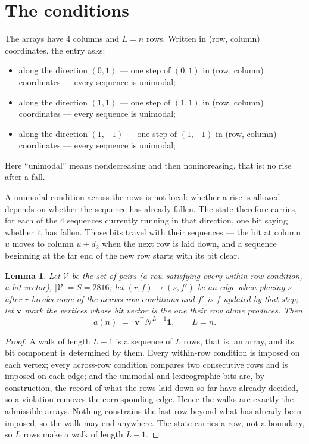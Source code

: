 \documentclass[11pt,a4paper]{article}
\theoremstyle{plain}
\newtheorem{lemma}[theorem]{Lemma}
\theoremstyle{definition}
\begin{document}
\section{The conditions}

The arrays have $4$ columns and $L=n$ rows. Written in (row, column)
coordinates, the entry asks:
\begin{itemize}
\item along the direction $(0,1)$ --- one step of $(0,1)$ in (row, column) coordinates --- every sequence is unimodal;
\item along the direction $(1,1)$ --- one step of $(1,1)$ in (row, column) coordinates --- every sequence is unimodal;
\item along the direction $(1,-1)$ --- one step of $(1,-1)$ in (row, column) coordinates --- every sequence is unimodal;
\end{itemize}
Here ``unimodal'' means nondecreasing and then nonincreasing, that is: no rise after a fall.

A unimodal condition across the rows is not local: whether a
rise is allowed depends on whether the sequence has already fallen. The state therefore
carries, for each of the $4$ sequences currently running in that direction, one bit saying
whether it has fallen. Those bits travel with their sequences --- the bit at column $u$
moves to column $u+d_2$ when the next row is laid down, and a sequence beginning at the
far end of the new row starts with its bit clear.

\begin{lemma}\label{lem:walk}
Let $\mathcal V$ be the set of pairs (a row satisfying every within-row condition, a
bit vector), $|\mathcal V|=S=2816$; let $(r,f)\to(s,f')$ be an edge when placing $s$ after $r$
breaks none of the across-row conditions and $f'$ is $f$ updated by that step; let
$\mathbf{v}$ mark the vertices whose bit vector is the one their row alone produces.
Then
\[
a(n)\;=\;\,\mathbf{v}^{\!\top}N^{\,L-1}\mathbf{1},\qquad L=n.
\]
\end{lemma}

\begin{proof}
A walk of length $L-1$ is a sequence of $L$ rows, that is, an array, and its bit component
is determined by them. Every within-row condition is imposed on each vertex; every
across-row condition compares two consecutive rows and is imposed on each edge; and the
unimodal and lexicographic bits are, by construction, the record of what the rows laid down
so far have already decided, so a violation removes the corresponding edge. Hence the walks
are exactly the admissible arrays. Nothing constrains the last row beyond what has already
been imposed, so the walk may end anywhere. The state carries a row, not a boundary, so
$L$ rows make a walk of length $L-1$.
\end{proof}
\end{document}
